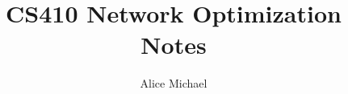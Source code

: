 \documentclass[11pt,letterpaper]{book}
\author{Alice Michael}
\title{CS410 Network Optimization Notes}
\date{}
\newcommand{\onlyinsubfile}[1]{#1}
\newcommand{\notinsubfile}[1]{}
\begin{document}
\renewcommand{\onlyinsubfile}[1]{}
\renewcommand{\notinsubfile}[1]{#1}


 \newpage

 \newpage

 \newpage

\end{document}
